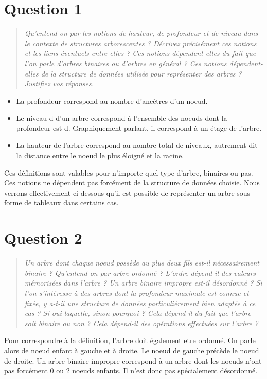 \documentclass[11pt,a4paper]{article}
\begin{document}
\section{Question 1}
\begin{quotation}
\color{gray}\textit{Qu’entend-on par les notions de hauteur, de profondeur et de niveau dans le contexte de structures arborescentes ? Décrivez précisément ces notions et les liens
éventuels entre elles ? Ces notions dépendent-elles du fait que l’on parle d’arbres
binaires ou d’arbres en général ? Ces notions dépendent-elles de la structure de
données utilisée pour représenter des arbres ? Justifiez vos réponses.}
\end{quotation}

\begin{itemize}
\item La profondeur correspond au nombre d'ancêtres d'un noeud.
\item Le niveau d d'un arbre correspond à l'ensemble des noeuds dont la profondeur est d. Graphiquement parlant,
il correspond à un étage de l'arbre.
\item La hauteur de l'arbre correspond au nombre total de niveaux, 
autrement dit la distance entre le noeud le plus éloigné et la racine.
\end{itemize}


Ces définitions sont valables pour n'importe quel type d'arbre, binaires ou pas. Ces notions ne dépendent pas forcément de la structure de données choisie. Nous verrons effectivement ci-dessous qu'il est possible de représenter un arbre sous forme de tableaux dans certains cas.

\section{Question 2} 
\begin{quotation}
\color{gray}\textit{Un arbre dont chaque noeud possède au plus deux fils est-il nécessairement binaire ? Qu’entend-on par arbre ordonné ? L’ordre dépend-il des valeurs mémorisées
dans l’arbre ? Un arbre binaire impropre est-il désordonné ?
Si l’on s’intéresse à des arbres dont la profondeur maximale est connue et fixée,
y a-t-il une structure de données particulièrement bien adaptée à ce cas ? Si oui
laquelle, sinon pourquoi ? Cela dépend-il du fait que l’arbre soit binaire ou non ?
Cela dépend-il des opérations effectuées sur l’arbre ?}
\end{quotation}

Pour correspondre à la définition, l'arbre doit également etre ordonné. On parle alors de noeud 
enfant à gauche et à droite. Le noeud de gauche précède le noeud de droite.
Un arbre binaire impropre correspond à un arbre dont les noeuds n'ont pas forcément 0 ou 2 noeuds enfants.
Il n'est donc pas spécialement désordonné.
\end{document}

